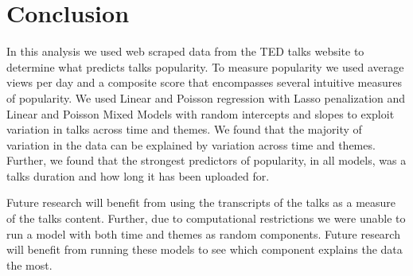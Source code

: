 \section{Conclusion}
In this analysis we used web scraped data from the TED talks website to determine what predicts talks popularity. To measure popularity we used average views per day and a composite score that encompasses several intuitive measures of popularity. 
We used Linear and Poisson regression with Lasso penalization and Linear and Poisson Mixed Models with random intercepts and slopes to exploit variation in talks across time and themes. We found that the majority of variation in the data can be explained by variation across time and themes. Further, we found that the strongest predictors of popularity, in all models, was a talks duration and how long it has been uploaded for. 

Future research will benefit from using the transcripts of the talks as a measure of the talks content. Further, due to computational restrictions we were unable to run a model with both time and themes as random components. Future research will benefit from running these models to see which component explains the data the most.